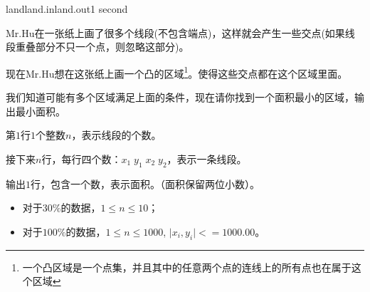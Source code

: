 \documentclass[11pt,a4paper,oneside]{article}
\begin{document}
\begin{problem}{land}{land.in}{land.out}{1 second} 

	Mr.Hu在一张纸上画了很多个线段(不包含端点)，这样就会产生一些交点(如果线段重叠部分不只一个点，则忽略这部分)。
	
	现在Mr.Hu想在这张纸上画一个凸的区域\footnote{一个凸区域是一个点集，并且其中的任意两个点的连线上的所有点也在属于这个区域}。使得这些交点都在这个区域里面。
	
	我们知道可能有多个区域满足上面的条件，现在请你找到一个面积最小的区域，输出最小面积。

    \InputFile
    
    第$1$行$1$个整数$n$，表示线段的个数。
    
    接下来$n$行，每行四个数：$x_1 \; y_1 \; x_2 \; y_2$，表示一条线段。

    \OutputFile
    
    输出$1$行，包含一个数，表示面积。（面积保留两位小数）。

    \Example

    \begin{example}
    \end{example}

    \Note
    
    \begin{itemize}
		\item 对于$30\%$的数据，$1 \leq n \leq 10$；
		\item 对于$100\%$的数据，$1 \leq n \leq 1000$, $\mid x_i, y_i \mid <= 1000.00$。
    \end{itemize}

\end{problem}
\end{document}

